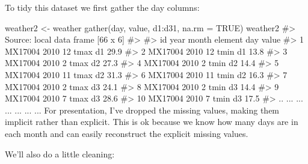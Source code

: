 To tidy this dataset we first gather the day columns:

weather2 <- weather %
  gather(day, value, d1:d31, na.rm = TRUE)
weather2
#> Source: local data frame [66 x 6]
#> 
#>         id year month element day value
#> 1  MX17004 2010    12    tmax  d1  29.9
#> 2  MX17004 2010    12    tmin  d1  13.8
#> 3  MX17004 2010     2    tmax  d2  27.3
#> 4  MX17004 2010     2    tmin  d2  14.4
#> 5  MX17004 2010    11    tmax  d2  31.3
#> 6  MX17004 2010    11    tmin  d2  16.3
#> 7  MX17004 2010     2    tmax  d3  24.1
#> 8  MX17004 2010     2    tmin  d3  14.4
#> 9  MX17004 2010     7    tmax  d3  28.6
#> 10 MX17004 2010     7    tmin  d3  17.5
#> ..     ...  ...   ...     ... ...   ...
For presentation, I've dropped the missing values, making them implicit rather than explicit. This is ok because we know how many days are in each month and can easily reconstruct the explicit missing values.

We'll also do a little cleaning:

